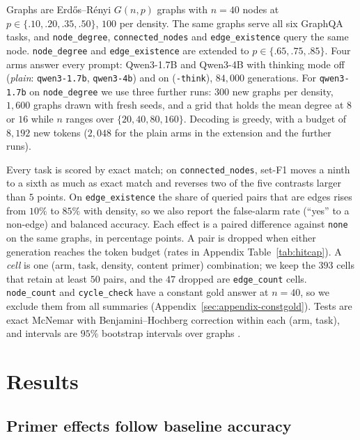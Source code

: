 \documentclass[11pt]{article}
\begin{document}
Graphs are Erd\H{o}s--R\'enyi $G(n,p)$ graphs
\citep{erdosrenyi1959random,gilbert1959random} with $n{=}40$ nodes at
$p\in\{.10,.20,.35,.50\}$, $100$ per density. The same graphs serve all six
GraphQA tasks, and \texttt{node\_degree}, \texttt{connected\_nodes} and
\texttt{edge\_existence} query the same node. \texttt{node\_degree} and
\texttt{edge\_existence} are extended to $p\in\{.65,.75,.85\}$. Four arms
answer every prompt: Qwen3-1.7B and Qwen3-4B \citep{qwen2025qwen3} with
thinking mode off (\emph{plain}: \texttt{qwen3-1.7b}, \texttt{qwen3-4b}) and on
(\texttt{-think}), $84{,}000$ generations. For \texttt{qwen3-1.7b} on
\texttt{node\_degree} we use three further runs: $300$ new graphs per density,
$1{,}600$ graphs drawn with fresh seeds, and a grid that holds the mean degree
at $8$ or $16$ while $n$ ranges over $\{20,40,80,160\}$. Decoding is greedy,
with a budget of $8{,}192$ new tokens ($2{,}048$ for the plain arms in the
extension and the further runs).

Every task is scored by exact match; on \texttt{connected\_nodes}, set-F1
moves a ninth to a sixth as much as exact match and reverses two of the five
contrasts larger than $5$ points. On \texttt{edge\_existence} the share of
queried pairs that are edges rises from $10\%$ to $85\%$ with density, so we
also report the false-alarm rate (``yes'' to a non-edge) and balanced
accuracy.
Each effect is a paired difference against \texttt{none} on the same graphs,
in percentage points. A pair is dropped when either generation reaches the
token budget (rates in Appendix Table~\ref{tab:hitcap}). A \emph{cell} is one
(arm, task, density, content primer) combination; we keep the $393$ cells that retain
at least $50$ pairs, and the $47$ dropped are \texttt{edge\_count} cells.
\texttt{node\_count} and \texttt{cycle\_check} have a constant gold answer at
$n{=}40$, so we exclude them from all summaries
(Appendix~\ref{sec:appendix-constgold}). Tests are exact McNemar
\citep{mcnemar1947note} with Benjamini--Hochberg correction
\citep{benjaminihochberg1995controlling} within each (arm, task), and
intervals are $95\%$ bootstrap intervals over graphs
\citep{efron1979bootstrap}.

\section{Results}
\label{sec:results}

\subsection{Primer effects follow baseline accuracy}
\label{sec:results-window}
\end{document}
